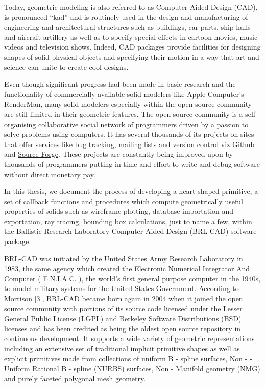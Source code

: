 \hspace{30}Today, geometric modeling is also referred to as Computer ­Aided Design
(CAD), is pronounced “kad” and is routinely used in the design and
manufacturing of engineering and architectural structures such as buildings, car  
parts, ship hulls and aircraft artillery as well as to specify special effects in  
cartoon movies, music videos and television shows. Indeed, CAD packages
provide facilities for designing shapes of solid physical objects and specifying
their motion in a way that art and science can unite to create cool designs.  

\hspace{30} Even though significant progress had been made in basic research and
the functionality of commercially available solid modelers like Apple
Computer's RenderMan, many solid modelers especially within the open
source community are still limited in their geometric features. The open
source community is a self­ organising collaborative social network of 
programmers driven by a passion to solve problems using computers.
It has several thousands of its projects on sites that offer services 
like bug tracking, mailing lists and version control viz \href{https://github.com/}{Github} 
and \href{http://sourceforge.net}{Source Forge}. These projects are constantly 
being improved upon by thousands of programmers putting in time and effort 
to write and debug software without direct monetary pay.

\hspace{30} In this thesis, we document the process of developing a heart­-shaped
primitive, a set of callback functions and procedures which compute geometrically 
useful properties of solids such as wireframe plotting, database importation and 
exportation, ray tracing, bounding box calculations, just to name a few, within the
 Ballistic Research Laboratory Computer Aided Design (BRL-­CAD) software package.  

\hspace{30} BRL-­CAD was initiated by the United States Army Research Laboratory
in 1983, the same agency which created the Electronic Numerical Integrator And 
Computer ( E.N.I.A.C. ), the world's first 
general ­purpose computer in the 1940s, to model military systems for the
United States Government. According to Morrison [3], BRL-­CAD became born again in 
2004 when it joined the open source community with portions of its source
code licensed under the Lesser General Public License (LGPL) and Berkeley
Software Distributions (BSD) licenses and has been credited as being the
oldest open source repository in continuous development. It supports a wide
variety of geometric representations including an extensive set of traditional
implicit primitive shapes as well as explicit primitives made from collections of
uniform B - ­spline surfaces, Non - ­Uniform Rational B - ­spline (NURBS) surfaces,  
Non­ - Manifold geometry (NMG) and purely faceted polygonal mesh geometry.  

